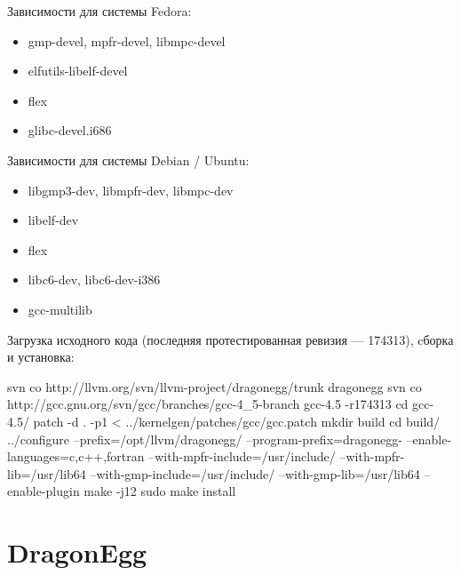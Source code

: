 \documentclass[a4,12pt]{report}
\begin{document}
Зависимости для системы Fedora:
\begin{itemize}
\item gmp-devel, mpfr-devel, libmpc-devel
\item elfutils-libelf-devel
\item flex
\item glibc-devel.i686
\end{itemize}


Зависимости для системы Debian / Ubuntu:
\begin{itemize}
\item libgmp3-dev, libmpfr-dev, libmpc-dev
\item libelf-dev
\item flex
\item libc6-dev, libc6-dev-i386
\item gcc-multilib
\end{itemize}

Загрузка исходного кода (последняя протестированная ревизия --- 174313), cборка и установка:

\begin{code}
svn co http://llvm.org/svn/llvm-project/dragonegg/trunk dragonegg
svn co http://gcc.gnu.org/svn/gcc/branches/gcc-4_5-branch gcc-4.5 -r174313
cd gcc-4.5/
patch -d . -p1 < ../kernelgen/patches/gcc/gcc.patch
mkdir build
cd build/
../configure --prefix=/opt/llvm/dragonegg/ --program-prefix=dragonegg-
--enable-languages=c,c++,fortran --with-mpfr-include=/usr/include/
--with-mpfr-lib=/usr/lib64 --with-gmp-include=/usr/include/
--with-gmp-lib=/usr/lib64 --enable-plugin
make -j12
sudo make install
\end{code}

\section{DragonEgg}
\end{document}
